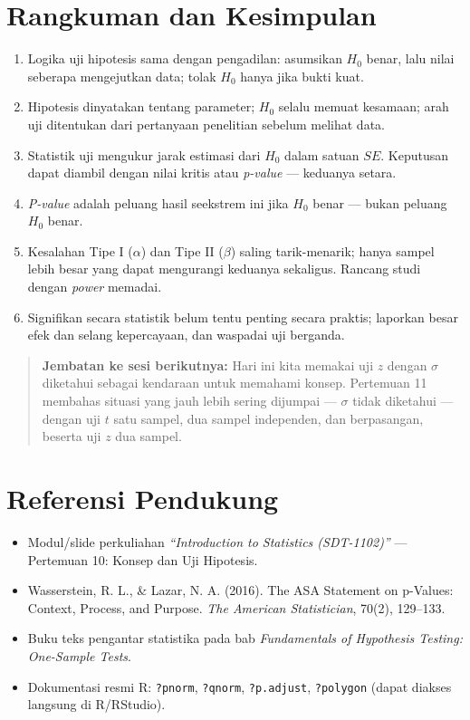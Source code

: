 \documentclass[
  indonesian,
  letterpaper,
]{book}
\providecommand{\tightlist}{%
  \setlength{\itemsep}{0pt}\setlength{\parskip}{0pt}}
\begin{document}
\section{Rangkuman dan Kesimpulan}\label{rangkuman-dan-kesimpulan-6}

\begin{enumerate}
\def\labelenumi{\arabic{enumi}.}
\tightlist
\item
  Logika uji hipotesis sama dengan pengadilan: asumsikan \(H_0\) benar,
  lalu nilai seberapa mengejutkan data; tolak \(H_0\) hanya jika bukti
  kuat.
\item
  Hipotesis dinyatakan tentang parameter; \(H_0\) selalu memuat
  kesamaan; arah uji ditentukan dari pertanyaan penelitian sebelum
  melihat data.
\item
  Statistik uji mengukur jarak estimasi dari \(H_0\) dalam satuan
  \(SE\). Keputusan dapat diambil dengan nilai kritis atau
  \emph{p-value} --- keduanya setara.
\item
  \emph{P-value} adalah peluang hasil seekstrem ini jika \(H_0\) benar
  --- bukan peluang \(H_0\) benar.
\item
  Kesalahan Tipe I (\(\alpha\)) dan Tipe II (\(\beta\)) saling
  tarik-menarik; hanya sampel lebih besar yang dapat mengurangi keduanya
  sekaligus. Rancang studi dengan \emph{power} memadai.
\item
  Signifikan secara statistik belum tentu penting secara praktis;
  laporkan besar efek dan selang kepercayaan, dan waspadai uji berganda.
\end{enumerate}

\begin{quote}
\textbf{Jembatan ke sesi berikutnya:} Hari ini kita memakai uji \(z\)
dengan \(\sigma\) diketahui sebagai kendaraan untuk memahami konsep.
Pertemuan 11 membahas situasi yang jauh lebih sering dijumpai ---
\(\sigma\) tidak diketahui --- dengan uji \(t\) satu sampel, dua sampel
independen, dan berpasangan, beserta uji \(z\) dua sampel.
\end{quote}

\section{Referensi Pendukung}\label{referensi-pendukung-5}

\begin{itemize}
\tightlist
\item
  Modul/slide perkuliahan \emph{``Introduction to Statistics
  (SDT-1102)''} --- Pertemuan 10: Konsep dan Uji Hipotesis.
\item
  Wasserstein, R. L., \& Lazar, N. A. (2016). The ASA Statement on
  p-Values: Context, Process, and Purpose. \emph{The American
  Statistician}, 70(2), 129--133.
\item
  Buku teks pengantar statistika pada bab \emph{Fundamentals of
  Hypothesis Testing: One-Sample Tests}.
\item
  Dokumentasi resmi R: \texttt{?pnorm}, \texttt{?qnorm},
  \texttt{?p.adjust}, \texttt{?polygon} (dapat diakses langsung di
  R/RStudio).
\end{itemize}
\end{document}
